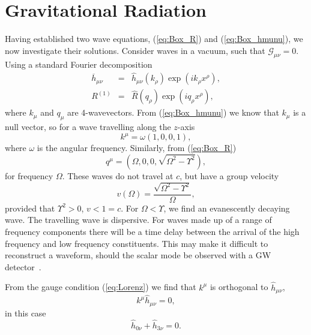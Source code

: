 \documentclass[aps,prd,amsfonts,amssymb,amsmath,nofootinbib,reprint,showpacs]{revtex4-1}
\newcommand{\eqnref}[1]{(\ref{eq:#1})}
\begin{document}
\section{Gravitational Radiation\label{sec:Rad}}

Having established two wave equations, \eqnref{Box_R} and \eqnref{Box_hmunu}, we now investigate their solutions. Consider waves in a vacuum, such that $\mathcal{G}_{\mu\nu} = 0$. Using a standard Fourier decomposition
\begin{eqnarray}
\overline{h}_{\mu\nu} & = & \widehat{h}_{\mu\nu}(k_\rho) \exp\left(ik_\rho x^\rho\right),\\
R^{(1)} & = & \widehat{R}(q_\rho) \exp\left(iq_\rho x^\rho\right),
\end{eqnarray}
where $k_\mu$ and $q_\mu$ are 4-wavevectors. From \eqnref{Box_hmunu} we know that $k_\mu$ is a null vector, so for a wave travelling along the $z$-axis
\begin{equation}
k^\mu = \omega(1, 0, 0, 1),
\end{equation}
where $\omega$ is the angular frequency. Similarly, from \eqnref{Box_R}
\begin{equation}
q^\mu = \left(\Omega, 0, 0, \sqrt{\Omega^2 - \Upsilon^2}\right),
\label{eq:Ricci_q}
\end{equation}
for frequency $\Omega$. These waves do not travel at $c$, but have a group velocity
\begin{equation}
v(\Omega) = \frac{\sqrt{\Omega^2 - \Upsilon^2}}{\Omega},
\end{equation}
provided that $\Upsilon^2 > 0$, $v < 1 = c$. For $\Omega < \Upsilon$, we find an evanescently decaying wave. The travelling wave is dispersive. For waves made up of a range of frequency components there will be a time delay between the arrival of the high frequency and low frequency constituents. This may make it difficult to reconstruct a waveform, should the scalar mode be observed with a GW detector~\cite{Corda2009a}.

From the gauge condition \eqnref{Lorenz} we find that $k^\mu$ is orthogonal to $\widehat{h}_{\mu\nu}$,
\begin{equation}
k^\mu\widehat{h}_{\mu\nu} = 0,
\end{equation}
in this case
\begin{equation}
\widehat{h}_{0\nu} + \widehat{h}_{3\nu} = 0.
\label{eq:Transverse}
\end{equation}
\end{document}
